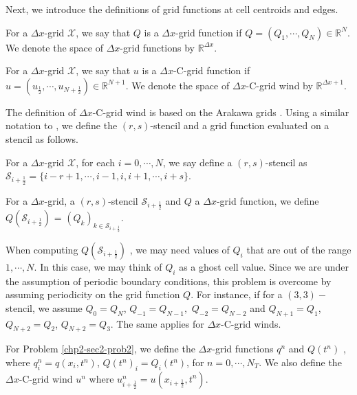 Next, we introduce the definitions of grid functions at cell centroids and edges. 
\begin{definition}
	\label{chp2-rmk-1d-gridfunction1}
	For a $\Delta x$-grid $\mathcal{X}$, we say that $Q$ is a $\Delta x$-grid function if $Q = (Q_1,\cdots, Q_N) \in \mathbb{R}^N$.
	We denote the space of $\Delta x$-grid functions by $\mathbb{R}^{\Delta x}$.
\end{definition}
\begin{definition}
	\label{chp2-rmk-1d-gridfunction2}
	For a $\Delta x$-grid $\mathcal{X}$, we say that $u$ is a $\Delta x$-C-grid function if $u = (u_{\frac{1}{2}}, \cdots, u_{N+\frac{1}{2}}) \in \mathbb{R}^{N+1}$.
	We denote the space of $\Delta x$-C-grid wind by $\mathbb{R}^{\Delta x+1}$.
\end{definition}
The definition of $\Delta x$-C-grid wind is based on the Arakawa grids \citep{arakawa:1977}.
Using a similar notation to \citet{engwirda:2016}, we define the $(r,s)$-stencil and a grid function evaluated on a stencil as follows.
\begin{definition}[$(r,s)$-stencil]
	\label{chp2-def-1d-stencil}
	For a $\Delta x$-grid $\mathcal{X}$, for each $i=0, \cdots, N$, we say define a $(r,s)$-stencil as
	$\mathcal{S}_{i+\frac{1}{2}} = \{i-r+1, \cdots, i-1, i,i+1, \cdots, i+s\}$.
\end{definition}
\begin{definition}
	\label{chp2-rmk-1d-Qstencil}
	For a $\Delta x$-grid, a $(r,s)$-stencil $\mathcal{S}_{i+\frac{1}{2}}$ and $Q$ a $\Delta x$-grid function, we define 
	$Q(\mathcal{S}_{i+\frac{1}{2}} )$ = $(Q_k)_{k \in \mathcal{S}_{i+\frac{1}{2}}}$.
\end{definition}
\begin{remark}
	When computing $Q(\mathcal{S}_{i+\frac{1}{2}} )$ , we may need values of $Q_i$ that are out of the range $1,\cdots, N$.
	In this case, we may think of $Q_{i}$ as a ghost cell value. 
	Since we are under the assumption of periodic boundary conditions, this problem
	is overcome by assuming periodicity on the grid function $Q$. 
	For instance, if for a $(3,3)-$stencil, we assume $Q_{0} = Q_{N}$, $Q_{-1} = Q_{N-1},$
	$Q_{-2} = Q_{N-2}$ and $Q_{N+1}=Q_1$, $Q_{N+2}=Q_2$, $Q_{N+2}=Q_3$. 
	The same applies for $\Delta x$-C-grid winds.
\end{remark}
\begin{remark}
	For Problem \ref{chp2-sec2-prob2}, we define the $\Delta x$-grid functions
	$q^n$ and $Q(t^n)$ , where ${q}^n_{i} = {q}(x_i, t^{n})$, $Q(t^n)_i = Q_i(t^n)$, for $n=0, \cdots, N_T$.
	We also define the $\Delta x$-C-grid wind $u^n$  where $u_{i+\frac{1}{2}}^n = u(x_{i+\frac{1}{2}},t^{n})$.
\end{remark}
